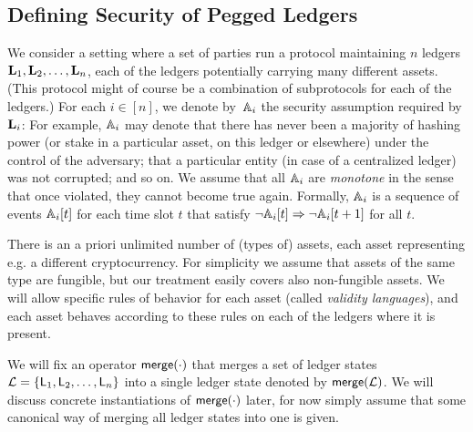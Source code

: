 \subsection{Defining Security of Pegged Ledgers}
\label{sec:definition}


We consider a setting where a set of parties run a protocol maintaining $n$
ledgers $\Ledger_1,\Ledger_2, \ldots,\Ledger_n$, each of the ledgers potentially
carrying many different assets. (This protocol might of course be a combination
of subprotocols for each of the ledgers.)
For each $i\in[n]$, we denote by~$\Assum_i$ the security assumption
required by $\Ledger_i$: For example, $\Assum_i$ may denote that
there has never been a majority of hashing power (or stake in a particular
asset, on this ledger or elsewhere) under the control of the adversary; that a
particular entity (in case of a centralized ledger) was not corrupted; and so
on.  We assume that all $\Assum_i$ are \emph{monotone} in the sense that once
violated, they cannot become true again. Formally, $\Assum_i$ is a
sequence of events $\Assum_i[t]$ for each time slot $t$ that satisfy
$\lnot\Assum_i[t] \Rightarrow \lnot\Assum_i[t+1]$ for all $t$.

There is an a priori unlimited number of (types of) assets, each asset
representing e.g. a different cryptocurrency.
For simplicity we assume that assets of the same type
are fungible, but our treatment easily covers also non-fungible assets.
We will allow specific rules of behavior for each asset (called \emph{validity
languages}), and each asset behaves
according to these rules on each of the ledgers where it is present.

We will fix an operator $\merge(\cdot)$ that
 merges a set of ledger states
$\mathcal{L}=\{\LState_1,\allowbreak \LState_2,\allowbreak \ldots,\allowbreak \LState_n\}$ into a single ledger
state  denoted by $\merge(\mathcal{L})$. We will discuss concrete instantiations
of $\merge(\cdot)$ later, for now simply assume that some canonical way of
merging all ledger states into one is given.

